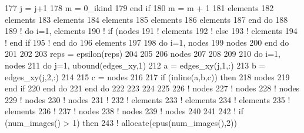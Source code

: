 \begin{DoxyCode}
177           j = j+1
178           m = 0\_ikind
179 \textcolor{keywordflow}{        end if}
180         m = m + 1
181         elements%
182         elements%
183         elements%
184         elements%
185         elements%
186         elements%
187 \textcolor{keywordflow}{      end do}
188 
189 \textcolor{comment}{!       do i=1, elements%
190 \textcolor{comment}{!       if (nodes%
191 \textcolor{comment}{!         elements%
192 \textcolor{comment}{!       else}
193 \textcolor{comment}{!         elements%
194 \textcolor{comment}{!       end if}
195 \textcolor{comment}{!       end do}
196       elements%
197       
198       \textcolor{keywordflow}{do} i=1, nodes%
199         nodes%
200 \textcolor{keywordflow}{      end do}
201       
202 
203       reps = epsilon(reps)
204       
205 
206       nodes%
207       
208     
209 
210       \textcolor{keywordflow}{do} i=1, nodes%
211         \textcolor{keywordflow}{do} j=1, ubound(edges\_xy,1)
212           a = edges\_xy(j,1,:)
213           b = edges\_xy(j,2,:)     
214 
215           c = nodes%
216 
217           \textcolor{keywordflow}{if} (inline(a,b,c)) \textcolor{keywordflow}{then}
218                 nodes%
219 \textcolor{keywordflow}{           end if}
220 \textcolor{keywordflow}{          end do}
221 \textcolor{keywordflow}{        end do}
222         
223 
224 
225 
226 \textcolor{comment}{!       nodes%
227 \textcolor{comment}{!       nodes%
228 \textcolor{comment}{!       nodes%
229 \textcolor{comment}{!       nodes%
230 \textcolor{comment}{!       nodes%
231 \textcolor{comment}{! }
232 \textcolor{comment}{!       elements%
233 \textcolor{comment}{!       elements%
234 \textcolor{comment}{!       elements%
235 \textcolor{comment}{!       elements%
236 \textcolor{comment}{! }
237 \textcolor{comment}{!       nodes%
238 \textcolor{comment}{!       nodes%
239 \textcolor{comment}{!       nodes%
240 
241 
242 \textcolor{comment}{!       if (num\_images() > 1) then}
243 \textcolor{comment}{!         allocate(cpus(num\_images(),2))}
}}}}}}}}}}}}}}}}
\end{DoxyCode}
